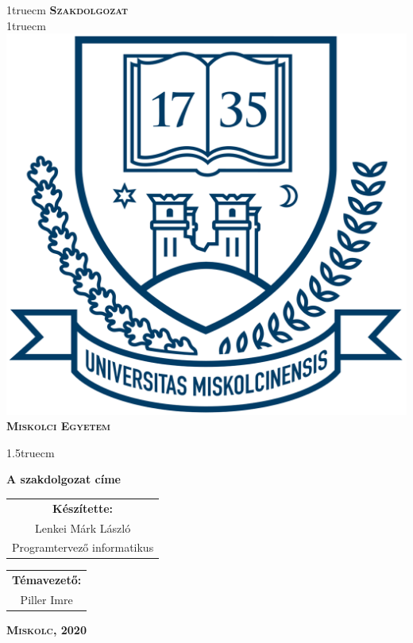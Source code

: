 \pagestyle{empty} %

{\large
\begin{center}
\vglue 1truecm
\textbf{\huge\textsc{Szakdolgozat}}\\
\vglue 1truecm
\includegraphics[width=4.8truecm, height=4truecm]{images/me_logo.png}\\
\textbf{\textsc{Miskolci Egyetem}}
\end{center}}

\vglue 1.5truecm %

{\LARGE
\begin{center}
\textbf{A szakdolgozat címe}
\end{center}}

\vspace*{2.5truecm}
{\large
\begin{center}
\begin{tabular}{c}
\textbf{Készítette:}\\
Lenkei Márk László\\
Programtervező informatikus
\end{tabular}
\end{center}
\begin{center}
\begin{tabular}{c}
\textbf{Témavezető:}\\
Piller Imre
\end{tabular}
\end{center}}
\vfill
{\large
\begin{center}
\textbf{\textsc{Miskolc, 2020}}
\end{center}}

\newpage
